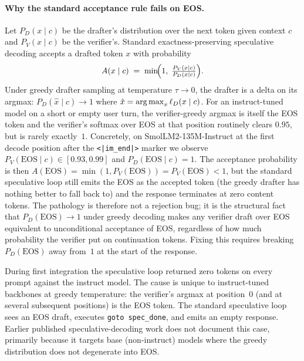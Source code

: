 \documentclass[11pt]{article}
\begin{document}
\paragraph{Why the standard acceptance rule fails on EOS.}
Let $P_D(x\mid c)$ be the drafter's distribution over the next token given
context $c$ and $P_V(x\mid c)$ be the verifier's.  Standard exactness-preserving
speculative decoding
\cite{leviathan2023speculative,chen2023speculative} accepts a drafted token
$x$ with probability
\begin{equation}
A(x\mid c)\;=\;\min\!\Bigl(1,\;\tfrac{P_V(x\mid c)}{P_D(x\mid c)}\Bigr).
\label{eq:accept}
\end{equation}
Under greedy drafter sampling at temperature $\tau\!\to\!0$, the
drafter is a delta on its argmax: $P_D(\hat x\mid c)\!\to\!1$ where
$\hat x=\operatorname*{arg\,max}_x \ell_D(x\mid c)$.  For an instruct-tuned model on a
short or empty user turn, the verifier-greedy argmax is itself the EOS
token and the verifier's softmax over EOS at that position routinely
clears $0.95$, but is rarely exactly~$1$.  Concretely, on
SmolLM2-135M-Instruct at the first decode position after the
\texttt{<|im\_end|>} marker we observe
$P_V(\text{EOS}\mid c)\in[0.93,0.99]$ and $P_D(\text{EOS}\mid c)=1$.  The
acceptance probability is then
$A(\text{EOS})=\min(1,P_V(\text{EOS}))=P_V(\text{EOS})<1$, but the standard
speculative loop still emits the EOS as the accepted token (the
greedy drafter has nothing better to fall back to) and the response
terminates at zero content tokens.  The pathology is therefore not a
rejection bug; it is the structural fact that $P_D(\text{EOS})\!\to\!1$
under greedy decoding makes any verifier draft over EOS equivalent
to unconditional acceptance of EOS, regardless of how much probability the
verifier put on continuation tokens.  Fixing this requires breaking
$P_D(\text{EOS})$ away from~$1$ at the start of the response.

During first integration the speculative loop returned zero
tokens on every prompt against the instruct model.  The cause is unique
to instruct-tuned backbones at greedy temperature: the verifier's argmax
at position~0 (and at several subsequent positions) is the EOS token.
The standard speculative loop sees an EOS draft, executes
\texttt{goto~spec\_done}, and emits an empty response.  Earlier
published speculative-decoding work
\cite{leviathan2023speculative,chen2023speculative,cai2024medusa,li2024eagle}
does not document this case, primarily because it targets base
(non-instruct) models where the greedy distribution does not degenerate
into EOS.
\end{document}
